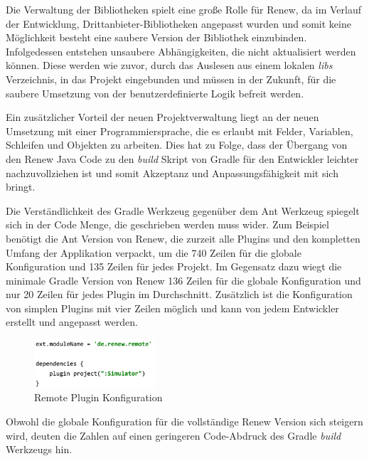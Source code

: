 	Die Verwaltung der Bibliotheken spielt eine große Rolle für Renew, da im Verlauf der Entwicklung, Drittanbieter-Bibliotheken angepasst wurden und somit keine Möglichkeit besteht eine saubere Version der Bibliothek einzubinden. Infolgedessen entstehen  unsaubere Abhängigkeiten, die nicht aktualisiert werden können. Diese werden wie zuvor, durch das Auslesen aus einem lokalen \textit{libs} Verzeichnis, in das Projekt eingebunden und müssen in der Zukunft, für die saubere Umsetzung von der benutzerdefinierte Logik befreit werden.
	\bigbreak

	Ein zusätzlicher Vorteil der neuen Projektverwaltung liegt an der neuen Umsetzung mit einer Programmiersprache, die es erlaubt mit Felder, Variablen, Schleifen und Objekten zu arbeiten. Dies hat zu Folge, dass der Übergang von den Renew Java Code zu den \textit{build} Skript von Gradle für den Entwickler leichter nachzuvollziehen ist und somit Akzeptanz und Anpassungsfähigkeit mit sich bringt. 


	Die Verständlichkeit des Gradle Werkzeug gegenüber dem Ant Werkzeug spiegelt sich in der Code Menge, die geschrieben werden muss wider. Zum Beispiel benötigt die Ant Version von Renew, die zurzeit alle Plugins und den kompletten Umfang der Applikation verpackt, um die 740 Zeilen für die globale Konfiguration und 135 Zeilen für jedes Projekt. Im Gegensatz dazu wiegt die minimale Gradle Version von Renew 136 Zeilen für die globale Konfiguration und nur 20 Zeilen für jedes Plugin im Durchschnitt. Zusätzlich ist die Konfiguration von simplen Plugins mit vier Zeilen möglich und kann von jedem Entwickler erstellt und angepasst werden. 
	\begin{figure}[h!]
	  \centering
	  \includegraphics[width=0.4\textwidth]{material/images/Remote_config.png}
	  \caption{Remote Plugin Konfiguration}
	  \label{fig:remote_config}
	\end{figure}	

	Obwohl die globale Konfiguration für die vollständige Renew Version sich steigern wird, deuten die Zahlen auf einen geringeren Code-Abdruck des Gradle \textit{build} Werkzeugs hin.
	\newpage
